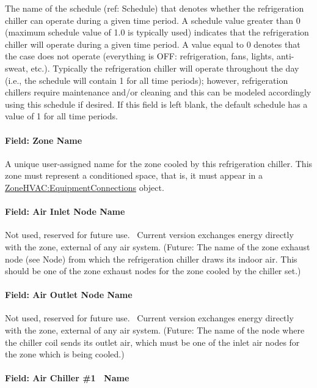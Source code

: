 The name of the schedule (ref: Schedule) that denotes whether the refrigeration chiller can operate during a given time period. A schedule value greater than 0 (maximum schedule value of 1.0 is typically used) indicates that the refrigeration chiller will operate during a given time period. A value equal to 0 denotes that the case does not operate (everything is OFF: refrigeration, fans, lights, anti-sweat, etc.). Typically the refrigeration chiller will operate throughout the day (i.e., the schedule will contain 1 for all time periods); however, refrigeration chillers require maintenance and/or cleaning and this can be modeled accordingly using this schedule if desired. If this field is left blank, the default schedule has a value of 1 for all time periods.

\paragraph{Field: Zone Name}\label{field-zone-name-1-011}

A unique user-assigned name for the zone cooled by this refrigeration chiller. This zone must represent a conditioned space, that is, it must appear in a \hyperref[zonehvacequipmentconnections]{ZoneHVAC:EquipmentConnections} object.

\paragraph{Field: Air Inlet Node Name}\label{field-air-inlet-node-name-7-000}

Not used, reserved for future use.~ Current version exchanges energy directly with the zone, external of any air system. (Future: The name of the zone exhaust node (see Node) from which the refrigeration chiller draws its indoor air. This should be one of the zone exhaust nodes for the zone cooled by the chiller set.)

\paragraph{Field: Air Outlet Node Name}\label{field-air-outlet-node-name-7-001}

Not used, reserved for future use.~ Current version exchanges energy directly with the zone, external of any air system. (Future: The name of the node where the chiller coil sends its outlet air, which must be one of the inlet air nodes for the zone which is being cooled.)

\paragraph{Field: Air Chiller \#1 ~Name}\label{field-air-chiller-1-name}

